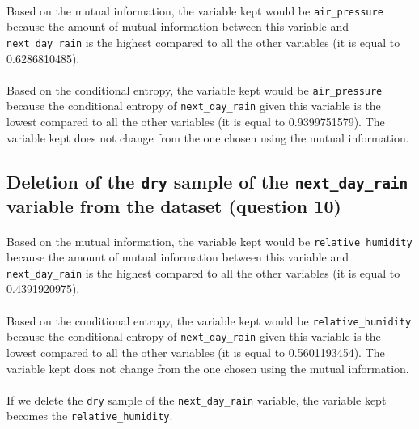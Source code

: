 \documentclass[a4paper, 11pt, oneside]{article}
\begin{document}
\paragraph{}Based on the mutual information, the variable kept would be \texttt{air\_pressure} because the amount of mutual information between this variable and \texttt{next\_day\_rain} is the highest compared to all the other variables (it is equal to 0.6286810485).

\paragraph{}Based on the conditional entropy, the variable kept would be \texttt{air\_pressure} because the conditional entropy of \texttt{next\_day\_rain} given this variable is the lowest compared to all the other variables (it is equal to 0.9399751579). The variable kept does not change from the one chosen using the mutual information.

\subsection{Deletion of the \texttt{dry} sample of the \texttt{next\_day\_rain} variable from the dataset (question 10)}

\paragraph{}Based on the mutual information, the variable kept would be \texttt{relative\_humidity} because the amount of mutual information between this variable and \texttt{next\_day\_rain} is the highest compared to all the other variables (it is equal to 0.4391920975).

\paragraph{}Based on the conditional entropy, the variable kept would be \texttt{relative\_humidity} because the conditional entropy of \texttt{next\_day\_rain} given this variable is the lowest compared to all the other variables (it is equal to 0.5601193454). The variable kept does not change from the one chosen using the mutual information.

\paragraph{}If we delete the \texttt{dry} sample of the \texttt{next\_day\_rain} variable, the variable kept becomes the \texttt{relative\_humidity}.
\end{document}
